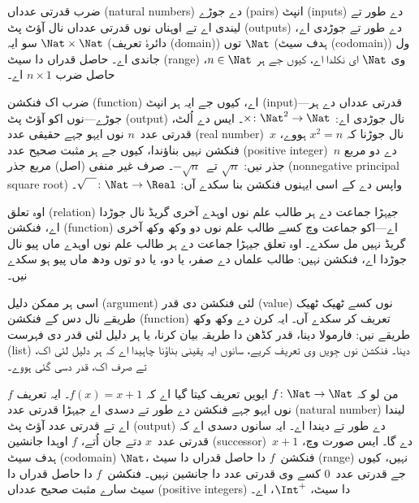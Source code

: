 \documentclass[../../../include/open-logic-section]{subfiles}
\begin{document}
\begin{ex}
ضرب قدرتی عدداں (natural numbers) دے جوڑے (pairs) انپٹ (inputs) دے طور تے لیندی اے تے اوہناں نوں
قدرتی عدداں نال آؤٹ پٹ (outputs) دے طور تے جوڑدی اے، سو ایہ $\Nat \times \Nat$
(دائرۂ تعریف (domain)) توں $\Nat$ (ہدف سیٹ (codomain)) ول جاندی اے۔ حاصل قدراں دا سیٹ (range) وی
$\Nat$ ای نکلدا اے، کیوں جے ہر $n \in \Nat$، حاصل ضرب $n \times 1$ اے۔
\end{ex}

\begin{ex}
ضرب اک فنکشن (function) اے، کیوں جے ایہ ہر انپٹ (input)---قدرتی عدداں دے ہر جوڑے---نوں
اکو آؤٹ پٹ (output) نال جوڑدی اے: $\times \colon \Nat^2 \to \Nat$۔ ایس دے
اُلٹ، قدرتی عدد~$n$ نوں ایہو جہے حقیقی عدد (real number)~$x$ نال جوڑنا کہ $x^2 = n$
ہووے، فنکشن نہیں بناؤندا، کیوں جے ہر مثبت صحیح عدد (positive integer)~$n$ دے دو مربع
جذر نیں: $\sqrt{n}$ تے~$-\sqrt{n}$۔ صرف غیر منفی (اصل) مربع جذر (nonnegative principal square root) واپس
دے کے اسی ایہنوں فنکشن بنا سکدے آں: $\sqrt{\phantom{X}} \colon \Nat \to \Real$۔
\end{ex}

\begin{ex}
اوہ تعلق (relation) جیہڑا جماعت دے ہر طالب علم نوں اوہدے آخری گریڈ نال جوڑدا
اے، فنکشن (function) اے---اکو جماعت وچ کسے طالب علم نوں دو وکھ وکھ آخری گریڈ
نہیں مل سکدے۔ اوہ تعلق جیہڑا جماعت دے ہر طالب علم نوں اوہدے ماں پیو
نال جوڑدا اے، فنکشن نہیں: طالب علماں دے صفر، یا دو، یا دو توں ودھ
ماں پیو ہو سکدے نیں۔
\end{ex}

\begin{explain}
اسی ہر ممکن دلیل (argument) لئی فنکشن دی قدر (value) نوں کسے ٹھیک ٹھیک طریقے نال دس
کے فنکشن (function) تعریف کر سکدے آں۔ ایہ کرن دے وکھ وکھ طریقے نیں: فارمولا
دینا، قدر کڈھن دا طریقہ بیان کرنا، یا ہر دلیل لئی قدر دی فہرست (list) دینا۔
فنکشن نوں جِویں وی تعریف کریے، سانوں ایہ یقینی بناؤنا چاہیدا اے کہ
ہر دلیل لئی اک، تے صرف اک، قدر دسی گئی ہووے۔
\end{explain}


\begin{ex}
من لو کہ $f \colon \Nat \to \Nat$ ایویں تعریف کیتا گیا اے کہ
$f(x) = x+1$۔ ایہ تعریف $f$ نوں ایہو جہے فنکشن دے طور تے دسدی اے
جیہڑا قدرتی عدد (natural number) لیندا اے تے قدرتی عدد آؤٹ پٹ (output) دے طور تے دیندا اے۔
ایہ سانوں دسدی اے کہ قدرتی عدد~$x$ دتے جان اُتے، $f$ اوہدا
جانشین (successor)~$x+1$ دے گا۔ ایس صورت وچ، ہدف سیٹ (codomain) $\Nat$، فنکشن~$f$ دا حاصل
قدراں دا سیٹ (range) نہیں، کیوں جے قدرتی عدد~$0$ کسے وی قدرتی عدد دا جانشین
نہیں۔ فنکشن~$f$ دا حاصل قدراں دا سیٹ سارے مثبت صحیح عدداں (positive integers) دا سیٹ،
$\Int^{+}$، اے۔
\end{ex}
\end{document}
